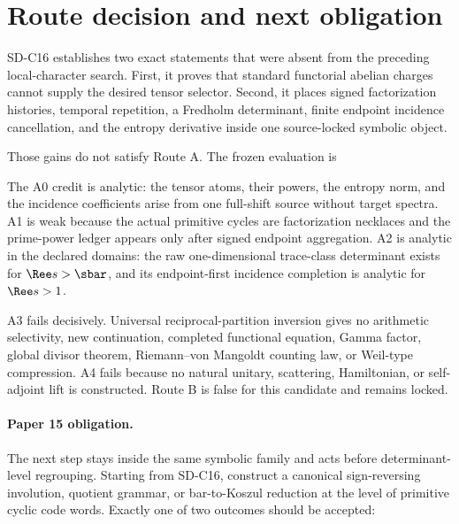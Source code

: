 \section{Route decision and next obligation}
\label{sec:route}

SD-C16 establishes two exact statements that were absent from the preceding
local-character search.  First, it proves that standard functorial abelian
charges cannot supply the desired tensor selector.  Second, it places signed
factorization histories, temporal repetition, a Fredholm determinant, finite
endpoint incidence cancellation, and the entropy derivative inside one
source-locked symbolic object.

Those gains do not satisfy Route A.  The frozen evaluation is
\begin{center}
\end{center}

The A0 credit is analytic: the tensor atoms, their powers, the entropy norm,
and the incidence coefficients arise from one full-shift source without
target spectra.  A1 is weak because the actual primitive cycles are
factorization necklaces and the prime-power ledger appears only after signed
endpoint aggregation.  A2 is analytic in the declared domains: the raw
one-dimensional trace-class determinant exists for $\Ree s>\sbar$, and its
endpoint-first incidence completion is analytic for $\Ree s>1$.

A3 fails decisively.  Universal reciprocal-partition inversion gives no
arithmetic selectivity, new continuation, completed functional equation,
Gamma factor, global divisor theorem, Riemann--von Mangoldt counting law, or
Weil-type compression.  A4 fails because no natural unitary, scattering,
Hamiltonian, or self-adjoint lift is constructed.  Route B is false for this
candidate and remains locked.

\paragraph{Paper 15 obligation.}
The next step stays inside the same symbolic family and acts before
determinant-level regrouping.  Starting from SD-C16, construct a canonical
sign-reversing involution, quotient grammar, or bar-to-Koszul reduction at the
level of primitive cyclic code words.  Exactly one of two outcomes should be
accepted:

